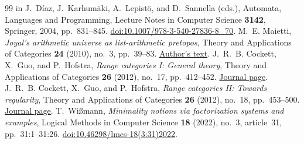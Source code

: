 \documentclass[11pt]{article}
\theoremstyle{definition}\newtheorem{definition}[theorem]{Definition}
\begin{document}
\begin{thebibliography}{99}
in J.~D\'iaz, J.~Karhum\"aki, A.~Lepist\"o, and D.~Sannella (eds.),
Automata, Languages and Programming, Lecture Notes in Computer Science
\textbf{3142}, Springer, 2004, pp.~831--845.
\href{https://doi.org/10.1007/978-3-540-27836-8_70}{doi:10.1007/978-3-540-27836-8\_70}.
M.~E. Maietti, \emph{Joyal's arithmetic universe as list-arithmetic pretopos},
Theory and Applications of Categories \textbf{24} (2010),
no.~3, pp.~39--83.
\href{https://www.math.unipd.it/~maietti/papers/jartacrev.pdf}{Author's text}.
J.~R.~B. Cockett, X.~Guo, and P.~Hofstra,
\emph{Range categories I: General theory},
Theory and Applications of Categories \textbf{26} (2012),
no.~17, pp.~412--452.
\href{https://www.tac.mta.ca/tac/volumes/26/17/26-17abs.html}{Journal page}.
J.~R.~B. Cockett, X.~Guo, and P.~Hofstra,
\emph{Range categories II: Towards regularity},
Theory and Applications of Categories \textbf{26} (2012),
no.~18, pp.~453--500.
\href{https://www.tac.mta.ca/tac/volumes/26/18/26-18abs.html}{Journal page}.
T.~Wi\ss{}mann, \emph{Minimality notions via factorization systems and examples},
Logical Methods in Computer Science \textbf{18} (2022),
no.~3, article~31, pp.~31:1--31:26.
\href{https://doi.org/10.46298/lmcs-18(3:31)2022}{doi:10.46298/lmcs-18(3:31)2022}.

\end{thebibliography}
\end{document}
